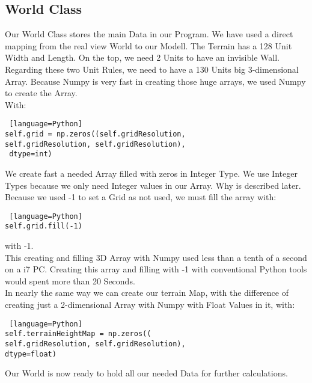 \documentclass{sig-alternate-05-2015}
\begin{document}
\subsection{World Class}
Our World Class stores the main Data in our Program. We have used a direct mapping from the real view World to our Modell. The Terrain has a 128 Unit Width and Length. On the top, we need 2 Units to have an invisible Wall. Regarding these two Unit Rules, we need to have a 130 Units big 3-dimensional Array. Because Numpy is very fast in creating those huge arrays, we used Numpy to create the Array. \\
With:\\
\begin{lstlisting} [language=Python]
self.grid = np.zeros((self.gridResolution, 
self.gridResolution, self.gridResolution),
 dtype=int)
\end{lstlisting}
We create fast a needed Array filled with zeros in Integer Type. We use Integer Types because we only need Integer values in our Array. Why is described later. Because we used -1 to set a Grid as not used, we must fill the array with:\\
\begin{lstlisting} [language=Python]
self.grid.fill(-1)
\end{lstlisting}
with -1. \\
This creating and filling 3D Array with Numpy used less than a tenth of a second on a i7 PC. Creating this array and filling with -1 with conventional Python tools would spent more than 20 Seconds. \\
In nearly the same way we can create our terrain Map, with the difference of creating just a 2-dimensional Array with Numpy with Float Values in it, with: \\
\begin{lstlisting} [language=Python]
self.terrainHeightMap = np.zeros((
self.gridResolution, self.gridResolution), 
dtype=float)
\end{lstlisting}
Our World is now ready to hold all our needed Data for further calculations.\\
\end{document}

